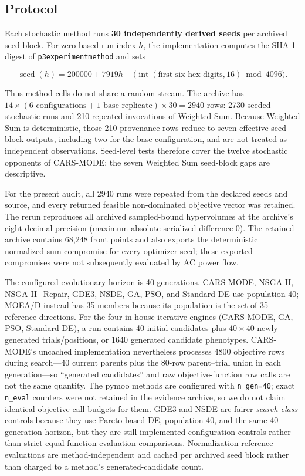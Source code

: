 \documentclass[energies,article,submit,moreauthors]{Definitions/mdpi}
\begin{document}
\subsection{Protocol}\label{protocol}

Each stochastic method runs \textbf{30 independently derived seeds} per archived seed block. For zero-based run index \(h\), the implementation computes the SHA-1 digest of \texttt{p3\textbar{}experiment\textbar{}method} and sets

\[
\operatorname{seed}(h)=200000+7919h+\big(\operatorname{int}(\text{first six hex digits},16)\bmod4096\big).
\]

Thus method cells do not share a random stream. The archive has \(14\times(6\text{ configurations}+1\text{ base replicate})\times30=2940\) rows: 2730 seeded stochastic runs and 210 repeated invocations of Weighted Sum. Because Weighted Sum is deterministic, those 210 provenance rows reduce to seven effective seed-block outputs, including two for the base configuration, and are not treated as independent observations. Seed-level tests therefore cover the twelve stochastic opponents of CARS-MODE; the seven Weighted Sum seed-block gaps are descriptive.

For the present audit, all 2940 runs were repeated from the declared seeds and source, and every returned feasible non-dominated objective vector was retained. The rerun reproduces all archived sampled-bound hypervolumes at the archive's eight-decimal precision (maximum absolute serialized difference 0). The retained archive contains 68,248 front points and also exports the deterministic normalized-sum compromise for every optimizer seed; these exported compromises were not subsequently evaluated by AC power flow.

The configured evolutionary horizon is 40 generations. CARS-MODE, NSGA-II, NSGA-II+Repair, GDE3, NSDE, GA, PSO, and Standard DE use population 40; MOEA/D instead has 35 members because its population is the set of 35 reference directions. For the four in-house iterative engines (CARS-MODE, GA, PSO, Standard DE), a run contains 40 initial candidates plus \(40\times40\) newly generated trials/positions, or 1640 generated candidate phenotypes. CARS-MODE's uncached implementation nevertheless processes 4800 objective rows during search---40 current parents plus the 80-row parent--trial union in each generation---so ``generated candidates'' and raw objective-function row calls are not the same quantity. The pymoo methods are configured with \texttt{n\_gen=40}; exact \texttt{n\_eval} counters were not retained in the evidence archive, so we do not claim identical objective-call budgets for them. GDE3 and NSDE are fairer \emph{search-class} controls because they use Pareto-based DE, population 40, and the same 40-generation horizon, but they are still implemented-configuration controls rather than strict equal-function-evaluation comparisons. Normalization-reference evaluations are method-independent and cached per archived seed block rather than charged to a method's generated-candidate count.
\end{document}
